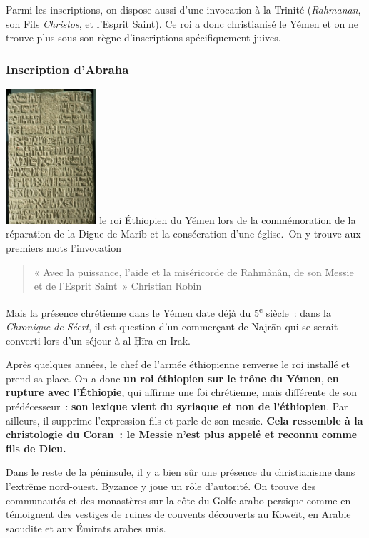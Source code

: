Parmi les inscriptions, on dispose aussi d'une invocation à la Trinité
(\emph{Rahmanan}, son Fils \emph{Christos}, et l'Esprit Saint). Ce roi a
donc christianisé le Yémen et on ne trouve plus sous son règne
d'inscriptions spécifiquement juives.

 
\subsubsection{Inscription d'Abraha}
\includegraphics[width=1.31747in,height=1.96757in]{Images/image033.jpg}
le roi
Éthiopien du Yémen lors de la commémoration de la réparation de la Digue
de Marib et la consécration d'une église.~On y trouve aux premiers mots
l'invocation~
\begin{quote}
    « Avec la puissance, l'aide et la miséricorde de Rahmânân,
de son Messie et de l'Esprit Saint~» 
Christian Robin
\end{quote}

Mais la présence chrétienne dans le Yémen date déjà du
5\textsuperscript{e} siècle~: dans la \emph{Chronique de
Séert}, il
est question d'un commerçant de Najrān qui se serait converti lors d'un
séjour à al-Ḥīra en Irak.

Après quelques années, le chef de l'armée éthiopienne renverse le roi
installé et prend sa place. On a donc \textbf{un roi éthiopien sur le
trône du Yémen}, \textbf{en rupture avec l'Éthiopie}, qui affirme une
foi chrétienne, mais différente de son prédécesseur~: \textbf{son
lexique vient du syriaque et non de l'éthiopien}. Par ailleurs, il
supprime l'expression fils et parle de son messie. \textbf{Cela
ressemble à la christologie du Coran~: le Messie n'est plus appelé et
reconnu comme fils de Dieu.}

Dans le reste de la péninsule, il y a bien sûr une présence du
christianisme dans l'extrême nord-ouest. Byzance y joue un rôle
d'autorité. On trouve des communautés et des monastères sur la côte du
Golfe arabo-persique comme en témoignent des vestiges de ruines de
couvents découverts au Koweït, en Arabie saoudite et aux Émirats arabes
unis.

